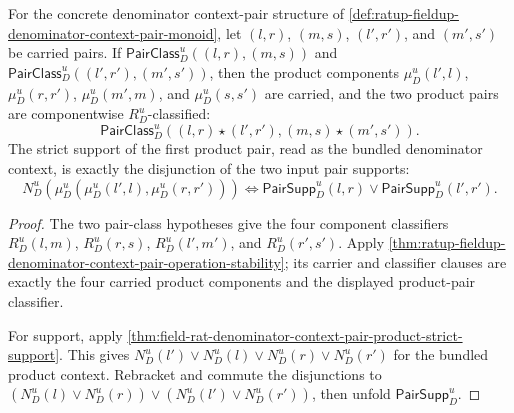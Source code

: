 \begin{theorem}
\label{thm:ratup-fieldup-denominator-context-pair-product-operation-stable}
For the concrete denominator context-pair structure of
\autoref{def:ratup-fieldup-denominator-context-pair-monoid}, let $(l,r)$,
$(m,s)$, $(l',r')$, and $(m',s')$ be carried pairs. If
$\mathsf{PairClass}_D^u((l,r),(m,s))$ and
$\mathsf{PairClass}_D^u((l',r'),(m',s'))$, then the product components
$\mu_D^u(l',l)$, $\mu_D^u(r,r')$, $\mu_D^u(m',m)$, and
$\mu_D^u(s,s')$ are carried, and the two product pairs are componentwise
$R_D^u$-classified:
$$
\mathsf{PairClass}_D^u((l,r)\star(l',r'),(m,s)\star(m',s')).
$$
The strict support of the first product pair, read as the bundled denominator
context, is exactly the disjunction of the two input pair supports:
$$
N_D^u(\mu_D^u(\mu_D^u(l',l),\mu_D^u(r,r')))
\Longleftrightarrow
\mathsf{PairSupp}_D^u(l,r)\lor\mathsf{PairSupp}_D^u(l',r').
$$
\end{theorem}
\begin{proof}
The two pair-class hypotheses give the four component classifiers
$R_D^u(l,m)$, $R_D^u(r,s)$, $R_D^u(l',m')$, and $R_D^u(r',s')$. Apply
\autoref{thm:ratup-fieldup-denominator-context-pair-operation-stability};
its carrier and classifier clauses are exactly the four carried product
components and the displayed product-pair classifier.

For support, apply
\autoref{thm:field-rat-denominator-context-pair-product-strict-support}. This
gives $N_D^u(l')\lor N_D^u(l)\lor N_D^u(r)\lor N_D^u(r')$ for the bundled
product context. Rebracket and commute the disjunctions to
$(N_D^u(l)\lor N_D^u(r))\lor(N_D^u(l')\lor N_D^u(r'))$, then unfold
$\mathsf{PairSupp}_D^u$.
\end{proof}


